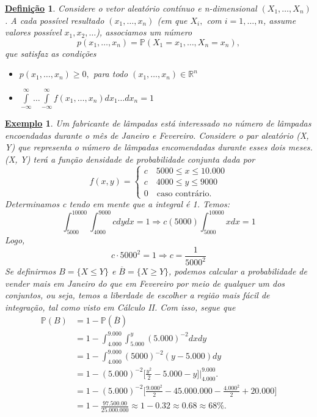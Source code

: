 \documentclass{article}
\newtheorem*{def*}{\underline{Defini\c c\~ao}}
\newtheorem{example}{\underline{Exemplo}}
\begin{document}
\begin{def*}
  Considere o vetor aleatório contínuo e n-dimensional \((X_{1}, \dotsc , X_{n})\). A cada possível resultado \((x_{1}, \dotsc , x_{n})\) (em que \(X_{i},\) com \(i=1, \dotsc , n\), assume valores possível \(x_{1}, x_{2}, \dotsc \)), associamos um número 
  \[
    p(x_{1}, \dotsc , x_{n}) = \mathbb{P}(X_{1} = x_{1}, \dotsc , X_{n}=x_{n}),
  \]
  que satisfaz as condições 
  \begin{itemize}
    \item[i)] \(p(x_{1}, \dotsc , x_{n}) \geq 0,\) para todo \((x_{1}, \dotsc , x_{n})\in \mathbb{R}^{n}\)
    \item[ii)] \(\int\limits_{-\infty}^{\infty}\dotsc \int\limits_{-\infty}^{\infty}f(x_{1}, \dotsc , x_{n})dx_{1}\dotsc dx_{n} = 1\)
  \end{itemize}
\end{def*}
\begin{example}
  Um fabricante de lâmpadas está interessado no número de lâmpadas encoendadas durante o mês de Janeiro e Fevereiro. Considere o par aleatório (X, Y) que representa o número de
  lâmpadas encomendadas durante esses dois meses. (X, Y) terá a função densidade de probabilidade conjunta dada por 
  \[
    f(x, y)  = \left\{\begin{array}{ll}
        c\quad 5000 \leq x \leq 10.000\\ 
        c\quad 4000 \leq y\leq 9000\\
        0\quad \text{caso contrário.}
    \end{array}\right.
  \]
  Determinamos c tendo em mente que a integral é 1. Temos:
  \[
    \int_{5000}^{10000}\int_{4000}^{9000}cdydx = 1 \Rightarrow c(5000)\int_{5000}^{10000}xdx = 1
  \]
  Logo, 
  \[
    c \cdot 5000^{2} = 1 \Rightarrow c = \frac{1}{5000^{2}}
  \]
  Se definirmos \(B = \{X \leq Y\}\) e \(\overline{B} = \{X \geq Y\}\), podemos calcular a probabilidade de vender mais em 
  Janeiro do que em Fevereiro por meio de qualquer um dos conjuntos, ou seja, temos a liberdade de escolher a região mais fácil de integração,
  tal como visto em Cálculo II. Com isso, segue que 
  \begin{align*}
    \mathbb{P}(B) &= 1 - \mathbb{P}(\overline{B}) \\
                  &= 1 - \int_{4.000}^{9.000} \int_{5.000}^{y}(5.000)^{-2}dxdy\\
                  &= 1 - \int_{4.000}^{9.000} (5000)^{-2}(y - 5.000)dy\\
                  &= 1 - (5.000)^{-2}\biggl[\frac{y^{2}}{2} - 5.000-y\biggr]\biggl|_{4.000}^{9.000}\biggr.\\
                  &= 1 - (5.000)^{-2}\biggl[\frac{9.000^{2}}{2} - 45.000.000 - \frac{4.000^{2}}{2} + 20.000\biggr]\\
                  &= 1 - \frac{97.500.00}{25.000.000} \approx 1 - 0.32 \approx 0.68 \approx 68\%.
  \end{align*}
\end{example}
\end{document}
